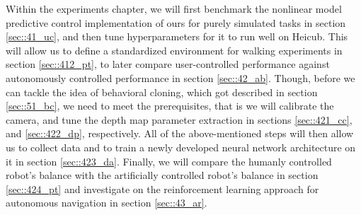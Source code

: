 \label{sec::4_ex}
Within the experiments chapter, we will first benchmark the nonlinear model predictive control implementation of ours for purely simulated tasks in section \ref{sec::41_uc}, and then tune hyperparameters for it to run well on Heicub. This will allow us to define a standardized environment for walking experiments in section \ref{sec::412_pt}, to later compare user-controlled performance against autonomously controlled performance in section \ref{sec::42_ab}. Though, before we can tackle the idea of behavioral cloning, which got described in section \ref{sec::51_bc}, we need to meet the prerequisites, that is we will calibrate the camera, and tune the depth map parameter extraction in sections \ref{sec::421_cc}, and \ref{sec::422_dp}, respectively. All of the above-mentioned steps will then allow us to collect data and to train a newly developed neural network architecture on it in section \ref{sec::423_da}. Finally, we will compare the humanly controlled robot's balance with the artificially controlled robot's balance in section \ref{sec::424_pt} and investigate on the reinforcement learning approach for autonomous navigation in section \ref{sec::43_ar}.